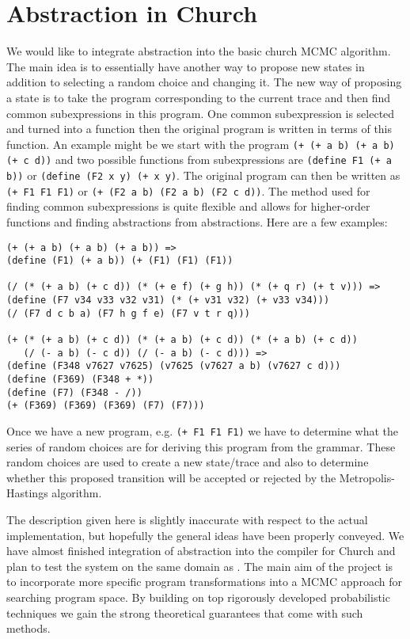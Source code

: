 \documentclass[a4paper,10pt]{article}
\begin{document}
\section{Abstraction in Church}
We would like to integrate abstraction into the basic church MCMC algorithm.  The main idea is to essentially have another way to propose new states in addition to selecting a random choice and changing it.  The new way of proposing a state is to take the program corresponding to the current trace and then find common subexpressions in this program.  One common subexpression is selected and turned into a function then the original program is written in terms of this function.  An example might be we start with the program \texttt{(+ (+ a b) (+ a b) (+ c d))} and two possible functions from subexpressions are \texttt{(define F1 (+ a b))} or \texttt{(define (F2 x y) (+ x y)}.  The original program can then be written as \texttt{(+ F1 F1 F1)} or \texttt{(+ (F2 a b) (F2 a b) (F2 c d))}.  The method used for finding common subexpressions is quite flexible and allows for higher-order functions and finding abstractions from abstractions.  Here are a few examples:
\begin{verbatim}
(+ (+ a b) (+ a b) (+ a b)) =>
(define (F1) (+ a b)) (+ (F1) (F1) (F1))
 
(/ (* (+ a b) (+ c d)) (* (+ e f) (+ g h)) (* (+ q r) (+ t v))) =>
(define (F7 v34 v33 v32 v31) (* (+ v31 v32) (+ v33 v34)))
(/ (F7 d c b a) (F7 h g f e) (F7 v t r q)))
 
(+ (* (+ a b) (+ c d)) (* (+ a b) (+ c d)) (* (+ a b) (+ c d))
   (/ (- a b) (- c d)) (/ (- a b) (- c d))) =>
(define (F348 v7627 v7625) (v7625 (v7627 a b) (v7627 c d)))
(define (F369) (F348 + *)) 
(define (F7) (F348 - /))
(+ (F369) (F369) (F369) (F7) (F7)))
\end{verbatim}
Once we have a new program, e.g. \texttt{(+ F1 F1 F1)} we have to determine what the series of random choices are for deriving this program from the grammar.  These random choices are used to create a new state/trace and also to determine whether this proposed transition will be accepted or rejected by the Metropolis-Hastings algorithm. 

The description given here is slightly inaccurate with respect to the actual implementation, but hopefully the general ideas have been properly conveyed.  We have almost finished integration of abstraction into the compiler for Church and plan to test the system on the same domain as \cite{A.Stuhlmueller:2010:6d11a}.  The main aim of the project is to incorporate more specific program transformations into a MCMC approach for searching program space.  By building on top rigorously developed probabilistic techniques we gain the strong theoretical guarantees that come with such methods.


\end{document}
